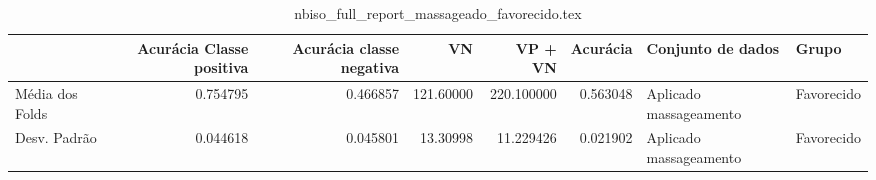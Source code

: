 \begin{table}
\centering
\caption{nbiso_full_report_massageado_favorecido.tex}
\label{nbiso_full_report_massageado_favorecido.tex}
\begin{tabular}{lrrrrrll}
\toprule
{} &  Acurácia Classe positiva &  Acurácia classe negativa &        VN  &    VP + VN  &  Acurácia &       Conjunto de dados &       Grupo \\
\midrule
Média dos Folds &                  0.754795 &                  0.466857 &  121.60000 &  220.100000 &  0.563048 &  Aplicado massageamento &  Favorecido \\
Desv. Padrão    &                  0.044618 &                  0.045801 &   13.30998 &   11.229426 &  0.021902 &  Aplicado massageamento &  Favorecido \\
\bottomrule
\end{tabular}
\end{table}
